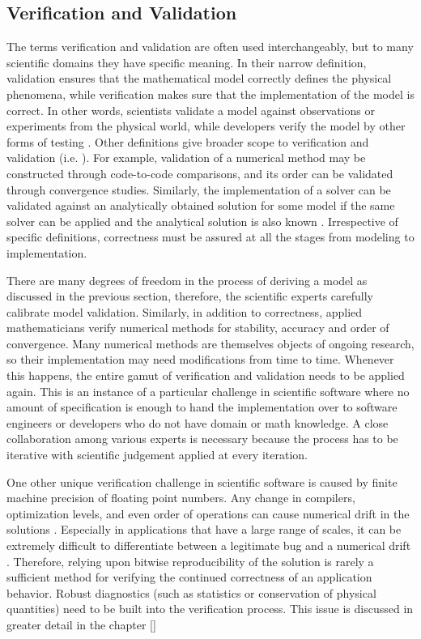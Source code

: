 \subsection{Verification and Validation}
\label{sec:vandv}
The terms verification and validation are often used interchangeably,
but to many scientific domains they have specific meaning.   
In their narrow definition, validation ensures that the mathematical
model correctly defines the physical phenomena, while verification
makes sure that the implementation of the model is correct. In other
words, scientists validate a model against observations or experiments from
the physical world, while developers verify the model by other forms of
testing \cite{oberkampf2002verification}.   Other definitions give
broader scope to  verification and validation (i.e. \cite{sargent1998verification}). For
example, validation of a numerical method may be constructed through
code-to-code comparisons, and its order can be validated through
convergence studies. Similarly, the implementation of a solver can be
validated against an analytically obtained solution for some model if
the same solver can be applied and the analytical solution is also
known \cite{oberkampf2010verification}.  Irrespective of  specific
definitions, correctness must be assured at all the stages from
modeling to implementation.      

There are many degrees of freedom in the process of deriving a
model as discussed in the previous section, therefore, the scientific
experts carefully calibrate model validation. Similarly, in addition
to correctness, applied mathematicians verify numerical methods for
stability, accuracy and order of convergence. Many numerical methods  
are themselves objects of ongoing research, so their
implementation may need modifications from time to time. Whenever
this happens, the entire gamut of verification and validation needs to
be applied again. This is an instance of a particular challenge in 
scientific software where no amount of specification is enough to hand the
implementation over to software engineers or developers who do not
have domain or math knowledge. A close collaboration among various
experts is necessary because the process has to be iterative with
scientific judgement applied at every iteration.  

One other unique verification challenge in scientific software is caused by 
finite machine precision of floating point numbers. Any change in
compilers, optimization levels, and even order of operations can cause
numerical drift in the solutions
\cite{monniaux2008pitfalls}. Especially in applications that have a
large range of scales, it can be extremely difficult to differentiate
between a legitimate bug and a numerical drift \cite{Dubey2015}. Therefore, relying
upon bitwise reproducibility of the solution is rarely a sufficient
method for verifying the continued correctness of an application
behavior. Robust diagnostics (such as statistics or conservation of
physical quantities) need to be built into the verification process.
This issue is discussed in greater detail in the chapter \ref{}

